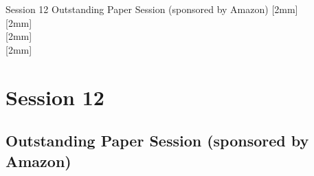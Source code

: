 \clearpage
{}
\begin{OneSessionOverview}{Session 12}{\daydateyear}
  {Outstanding Paper Session (sponsored by Amazon)}{}
  [2mm]
  \\
  \hline
  [2mm]
  \\
  \hline
  [2mm]
  \\
  \hline
  [2mm]
  \\
\end{OneSessionOverview}

\newpage
\section*{Session 12}
\subsection{Outstanding Paper Session (sponsored by Amazon)}
\TrackALoc\hfill{}
\clearpage


